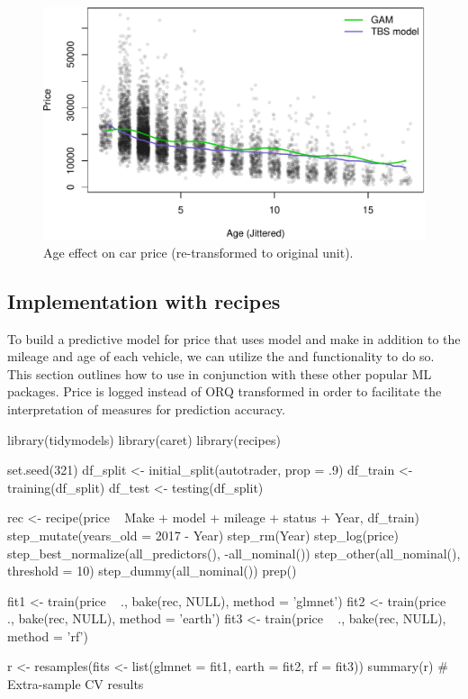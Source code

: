\begin{Schunk}
\begin{figure}

{\centering \includegraphics[width=0.8\linewidth]{figs/gam_tbs_model-1} 

}

\caption[Age effect on car price (re-transformed to original unit)]{Age effect on car price (re-transformed to original unit).}\label{fig:gam_tbs_model}
\end{figure}
\end{Schunk}

\hypertarget{implementation-with-recipes}{%
\subsection{Implementation with
recipes}\label{implementation-with-recipes}}

To build a predictive model for price that uses model and make in
addition to the mileage and age of each vehicle, we can utilize the
 and  functionality to do so. This section
outlines how to use  in conjunction with these other
popular ML packages. Price is logged instead of ORQ transformed in order
to facilitate the interpretation of measures for prediction accuracy.

\begin{Schunk}
\begin{Sinput}
library(tidymodels)
library(caret)
library(recipes)

set.seed(321)
df_split <- initial_split(autotrader, prop = .9)
df_train <- training(df_split)
df_test <- testing(df_split)

rec <- recipe(price ~ Make + model +  mileage + status + Year, df_train) %
  step_mutate(years_old = 2017 - Year) %
  step_rm(Year) %
  step_log(price) %
  step_best_normalize(all_predictors(), -all_nominal()) %
  step_other(all_nominal(), threshold = 10) %
  step_dummy(all_nominal()) %
  prep()

fit1 <- train(price ~ ., bake(rec, NULL), method = 'glmnet')
fit2 <- train(price ~ ., bake(rec, NULL), method = 'earth')
fit3 <- train(price ~ ., bake(rec, NULL), method = 'rf')

r <- resamples(fits <- list(glmnet = fit1, earth = fit2, rf = fit3))
summary(r) # Extra-sample CV results
\end{Sinput}
\end{Schunk}

